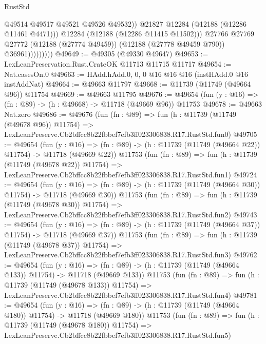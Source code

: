 \begin{lexlean}{RustStd}
\begin{coremodule}
                              @49514
                              @49517
                              @49521
                              @49526
                              @49532))
                          @21827
                          @12284
                          (@12188 (@12286 @11461 @4471)))
                        @12284
                        (@12188 (@12286 @11415 @11502)))
                      @27766
                      @27769
                      @27772
                      (@12188 (@27774 @49459))
                      (@12188 (@27778 @49459 @790))
                      @36961)))))))))
@49649 := @49305 (@49330 @49647)
@49653 := LexLeanPreservation.Rust.CrateOK @11713 @11715 @11717
@49654 := Nat.casesOn.{0}
@49663 := HAdd.hAdd.{0, 0, 0} @16 @16 @16 (instHAdd.{0} @16 instAddNat)
@49664 := @49663 @11797
@49668 := @11739 (@11749 (@49664 @96)) @11754
@49669 := @49663 @11795
@49676 := @49654 (fun (y : @16) => (fn : @89) -> (h : @49668) -> @11718 (@49669 @96)) @11753
@49678 := @49663 Nat.zero
@49686 := @49676
    (fun (fn : @89) =>
    fun (h : @11739 (@11749 (@49678 @96)) @11754) =>
    LexLeanPreserve.Cb2bffcc8b22fbbef7efb3ff023306838.R17.RustStd.fun0)
@49705 := @49654
    (fun (y : @16) =>
    (fn : @89) -> (h : @11739 (@11749 (@49664 @22)) @11754) -> @11718 (@49669 @22))
    @11753
    (fun (fn : @89) =>
    fun (h : @11739 (@11749 (@49678 @22)) @11754) =>
    LexLeanPreserve.Cb2bffcc8b22fbbef7efb3ff023306838.R17.RustStd.fun1)
@49724 := @49654
    (fun (y : @16) =>
    (fn : @89) -> (h : @11739 (@11749 (@49664 @30)) @11754) -> @11718 (@49669 @30))
    @11753
    (fun (fn : @89) =>
    fun (h : @11739 (@11749 (@49678 @30)) @11754) =>
    LexLeanPreserve.Cb2bffcc8b22fbbef7efb3ff023306838.R17.RustStd.fun2)
@49743 := @49654
    (fun (y : @16) =>
    (fn : @89) -> (h : @11739 (@11749 (@49664 @37)) @11754) -> @11718 (@49669 @37))
    @11753
    (fun (fn : @89) =>
    fun (h : @11739 (@11749 (@49678 @37)) @11754) =>
    LexLeanPreserve.Cb2bffcc8b22fbbef7efb3ff023306838.R17.RustStd.fun3)
@49762 := @49654
    (fun (y : @16) =>
    (fn : @89) -> (h : @11739 (@11749 (@49664 @133)) @11754) -> @11718 (@49669 @133))
    @11753
    (fun (fn : @89) =>
    fun (h : @11739 (@11749 (@49678 @133)) @11754) =>
    LexLeanPreserve.Cb2bffcc8b22fbbef7efb3ff023306838.R17.RustStd.fun4)
@49781 := @49654
    (fun (y : @16) =>
    (fn : @89) -> (h : @11739 (@11749 (@49664 @180)) @11754) -> @11718 (@49669 @180))
    @11753
    (fun (fn : @89) =>
    fun (h : @11739 (@11749 (@49678 @180)) @11754) =>
    LexLeanPreserve.Cb2bffcc8b22fbbef7efb3ff023306838.R17.RustStd.fun5)

\end{coremodule}
\end{lexlean}
